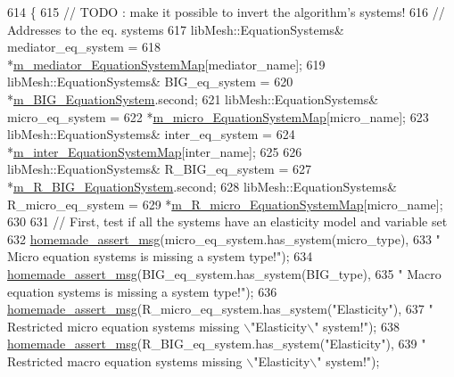 \begin{DoxyCode}
614     \{
615         \textcolor{comment}{// TODO : make it possible to invert the algorithm's systems!}
616         \textcolor{comment}{// Addresses to the eq. systems}
617         libMesh::EquationSystems& mediator\_eq\_system =
618                 *\hyperlink{classcarl_1_1assemble__coupling__matrices_a9d61d2378c5658d6cfc7fa0d2ef306a5}{m\_mediator\_EquationSystemMap}[mediator\_name];
619         libMesh::EquationSystems& BIG\_eq\_system =
620                 *\hyperlink{classcarl_1_1assemble__coupling__matrices_a74638b62015299b30afb23168b141429}{m\_BIG\_EquationSystem}.second;
621         libMesh::EquationSystems& micro\_eq\_system =
622                 *\hyperlink{classcarl_1_1assemble__coupling__matrices_a13fddbcb853df9b7ce1a99062fb9f8b6}{m\_micro\_EquationSystemMap}[micro\_name];
623         libMesh::EquationSystems& inter\_eq\_system =
624                 *\hyperlink{classcarl_1_1assemble__coupling__matrices_a6c9fab72397ed371acccbf88fd72665f}{m\_inter\_EquationSystemMap}[inter\_name];
625 
626         libMesh::EquationSystems& R\_BIG\_eq\_system =
627                 *\hyperlink{classcarl_1_1assemble__coupling__matrices_ac8e2172182aa563e854e7b693344b301}{m\_R\_BIG\_EquationSystem}.second;
628         libMesh::EquationSystems& R\_micro\_eq\_system =
629                 *\hyperlink{classcarl_1_1assemble__coupling__matrices_a5b7c4f9307a9611926dc1ccf8bb33d4b}{m\_R\_micro\_EquationSystemMap}[micro\_name];
630 
631         \textcolor{comment}{// First, test if all the systems have an elasticity model and variable set}
632         \hyperlink{common__header_8h_a593ccc80b790b2268653fcf6597bf451}{homemade\_assert\_msg}(micro\_eq\_system.has\_system(micro\_type),
633                 \textcolor{stringliteral}{" Micro equation systems is missing a system type!"});
634         \hyperlink{common__header_8h_a593ccc80b790b2268653fcf6597bf451}{homemade\_assert\_msg}(BIG\_eq\_system.has\_system(BIG\_type),
635                 \textcolor{stringliteral}{" Macro equation systems is missing a system type!"});
636         \hyperlink{common__header_8h_a593ccc80b790b2268653fcf6597bf451}{homemade\_assert\_msg}(R\_micro\_eq\_system.has\_system(\textcolor{stringliteral}{"Elasticity"}),
637                 \textcolor{stringliteral}{" Restricted micro equation systems missing \(\backslash\)"Elasticity\(\backslash\)" system!"});
638         \hyperlink{common__header_8h_a593ccc80b790b2268653fcf6597bf451}{homemade\_assert\_msg}(R\_BIG\_eq\_system.has\_system(\textcolor{stringliteral}{"Elasticity"}),
639                 \textcolor{stringliteral}{" Restricted macro equation systems missing \(\backslash\)"Elasticity\(\backslash\)" system!"});

\end{DoxyCode}

